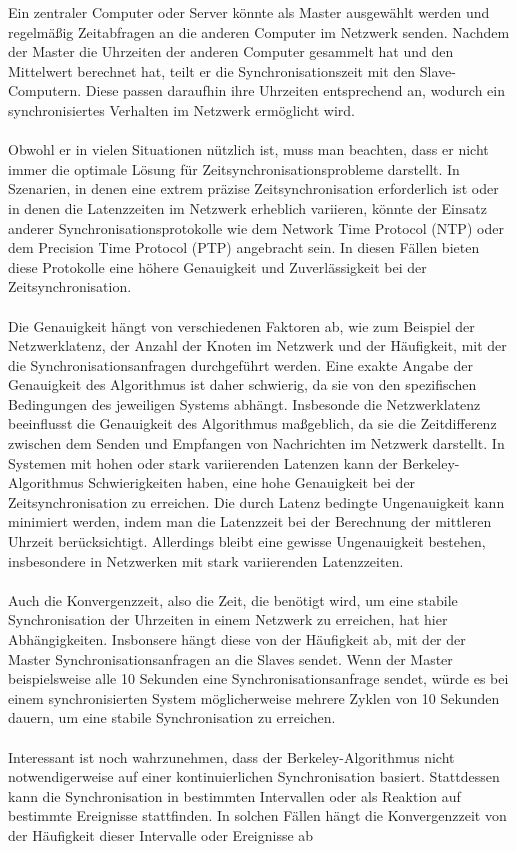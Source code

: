 Ein zentraler Computer oder Server könnte als Master ausgewählt werden und regelmäßig Zeitabfragen an die anderen Computer im Netzwerk senden. Nachdem der Master die Uhrzeiten der anderen Computer gesammelt hat und den Mittelwert berechnet hat, teilt er die Synchronisationszeit mit den Slave-Computern. Diese passen daraufhin ihre Uhrzeiten entsprechend an, wodurch ein synchronisiertes Verhalten im Netzwerk ermöglicht wird.
\\\\
Obwohl er in vielen Situationen nützlich ist, muss man beachten, dass er nicht immer die optimale Lösung für Zeitsynchronisationsprobleme darstellt. In Szenarien, in denen eine extrem präzise Zeitsynchronisation erforderlich ist oder in denen die Latenzzeiten im Netzwerk erheblich variieren, könnte der Einsatz anderer Synchronisationsprotokolle wie dem Network Time Protocol (NTP) oder dem Precision Time Protocol (PTP) angebracht sein. In diesen Fällen bieten diese Protokolle eine höhere Genauigkeit und Zuverlässigkeit bei der Zeitsynchronisation.
\\\\
Die Genauigkeit hängt von verschiedenen Faktoren ab, wie zum Beispiel der Netzwerklatenz, der Anzahl der Knoten im Netzwerk und der Häufigkeit, mit der die Synchronisationsanfragen durchgeführt werden. Eine exakte Angabe der Genauigkeit des Algorithmus ist daher schwierig, da sie von den spezifischen Bedingungen des jeweiligen Systems abhängt. Insbesonde die Netzwerklatenz beeinflusst die Genauigkeit des Algorithmus maßgeblich, da sie die Zeitdifferenz zwischen dem Senden und Empfangen von Nachrichten im Netzwerk darstellt. In Systemen mit hohen oder stark variierenden Latenzen kann der Berkeley-Algorithmus Schwierigkeiten haben, eine hohe Genauigkeit bei der Zeitsynchronisation zu erreichen. Die durch Latenz bedingte Ungenauigkeit kann minimiert werden, indem man die Latenzzeit bei der Berechnung der mittleren Uhrzeit berücksichtigt. Allerdings bleibt eine gewisse Ungenauigkeit bestehen, insbesondere in Netzwerken mit stark variierenden Latenzzeiten.
\\\\
Auch die Konvergenzzeit, also die Zeit, die benötigt wird, um eine stabile Synchronisation der Uhrzeiten in einem Netzwerk zu erreichen, hat hier Abhängigkeiten.  Insbonsere hängt diese von der Häufigkeit ab, mit der der Master Synchronisationsanfragen an die Slaves sendet. Wenn der Master beispielsweise alle 10 Sekunden eine Synchronisationsanfrage sendet, würde es bei einem synchronisierten System möglicherweise mehrere Zyklen von 10 Sekunden dauern, um eine stabile Synchronisation zu erreichen. 
\\\\
Interessant ist noch wahrzunehmen, dass der Berkeley-Algorithmus nicht notwendigerweise auf einer kontinuierlichen Synchronisation basiert. Stattdessen kann die Synchronisation in bestimmten Intervallen oder als Reaktion auf bestimmte Ereignisse stattfinden. In solchen Fällen hängt die Konvergenzzeit von der Häufigkeit dieser Intervalle oder Ereignisse ab

